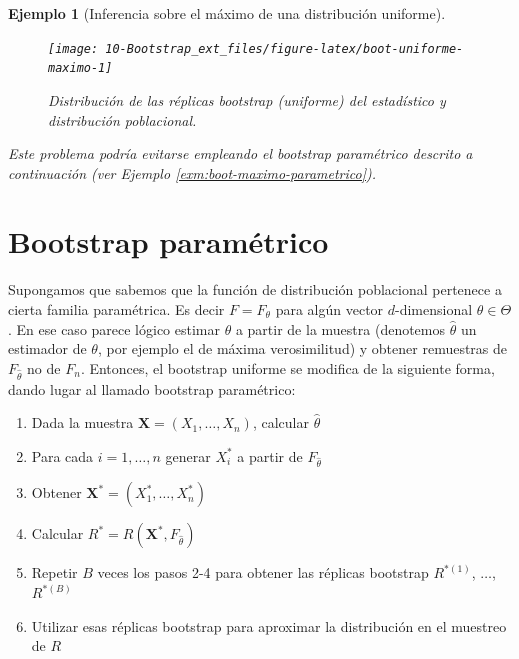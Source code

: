 \documentclass[
  10pt,
]{book}
\renewcommand{\mathbf}[1]{\symbf{#1}}
\theoremstyle{break}
\newtheorem{example}{Ejemplo}[chapter]
\theoremstyle{nonumberplain}
\begin{document}
\begin{example}[Inferencia sobre el máximo de una distribución uniforme]
\begin{figure}[!htbp]

{\centering \texttt{[image: 10-Bootstrap\_ext\_files/figure-latex/boot-uniforme-maximo-1]} 

}

\caption{Distribución de las réplicas bootstrap (uniforme) del estadístico y distribución poblacional.}\label{fig:boot-uniforme-maximo}
\end{figure}

Este problema podría evitarse empleando el bootstrap paramétrico descrito a continuación (ver Ejemplo \ref{exm:boot-maximo-parametrico}).
\end{example}

\hypertarget{modunif-boot-par}{%
\section{Bootstrap paramétrico}\label{modunif-boot-par}}

Supongamos que sabemos que la función de distribución poblacional
pertenece a cierta familia paramétrica. Es decir \(F=F_{\theta }\) para
algún vector \(d\)-dimensional \(\theta \in \Theta\). En ese caso parece
lógico estimar \(\theta\) a partir de la muestra (denotemos
\(\hat{\theta}\) un estimador de \(\theta\), por ejemplo el de máxima
verosimilitud) y obtener remuestras de \(F_{\hat{\theta}}\) no de \(F_n\).
Entonces, el bootstrap uniforme se modifica de la siguiente forma, dando
lugar al llamado bootstrap paramétrico:

\begin{enumerate}
\def\labelenumi{\arabic{enumi}.}
\item
  Dada la muestra
  \(\mathbf{X}=\left( X_1,\ldots ,X_n \right)\), calcular \(\hat{\theta}\)
\item
  Para cada \(i=1,\ldots ,n\) generar \(X_i^{\ast}\) a partir de \(F_{\hat{\theta}}\)
\item
  Obtener \(\mathbf{X}^{\ast}=\left( X_1^{\ast},\ldots ,X_n^{\ast} \right)\)
\item
  Calcular \(R^{\ast}=R\left( \mathbf{X}^{\ast},F_{\hat{\theta}} \right)\)
\item
  Repetir \(B\) veces los pasos 2-4 para obtener las réplicas bootstrap
  \(R^{\ast (1)}\), \(\ldots\), \(R^{\ast (B)}\)
\item
  Utilizar esas réplicas bootstrap para aproximar la distribución en el muestreo de \(R\)
\end{enumerate}
\end{document}
